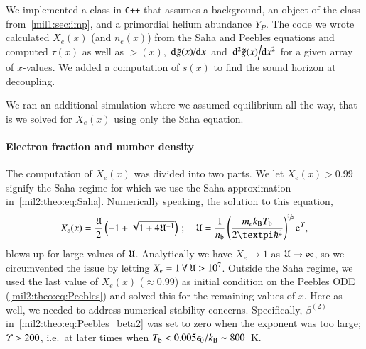 

We implemented a class in \verb|C++| that assumes a background, an object of the class from~\cref{mil1:sec:imp}, and a primordial helium abundance $Y_P$. The code we wrote calculated $X_e(x)$ (and $n_e(x)$) from the Saha and Peebles equations and computed $\tau(x)$ as well as $\gt(x)$, $\dv*[]{\tilde{g}(x)}{x}$ and $\dv*[2]{\tilde{g}(x)}{x}$ for a given array of $x$-values. We added a computation of $s(x)$ to find the sound horizon at decoupling.

We ran an additional simulation where we assumed equilibrium all the way, that is we solved for $X_e(x)$ using only the Saha equation. 

\paragraph{Electron fraction and number density}
    The computation of $X_e(x)$ was divided into two parts. We let $X_e(x)>0.99$ signify the Saha regime for which we use the Saha approximation in~\cref{mil2:theo:eq:Saha}. Numerically speaking, the solution to this equation, 
    \begin{equation}\label{mil2:imp:eq:sol_Saha}
        X_e(x) = \frac{\expr}{2}\left( -1+\sqrt{1+4\expr^{-1}}\right)\,; \quad 
            \expr = \frac{1}{n\ped{b}} \left( \frac{m_e k\ped{B} T\ped{b} }{2\pi \hbar^2} \right)^{\sfrac{3}{2}} \eu^{\epskT},
    \end{equation}
    blows up for large values of $\mathfrak{U}$. Analytically we have $X_e\to 1$ as $\mathfrak{U}\to \infty$, so we circumvented the issue by letting $X_e=1 \,\forall\, \mathfrak{U} > 10^7$. Outside the Saha regime, we used the last value of $X_e(x)$ ($\approx 0.99$) as initial condition on the Peebles ODE (\cref{mil2:theo:eq:Peebles}) and solved this for the remaining values of $x$. Here as well, we needed to address numerical stability concerns. Specifically, $\beta^{(2)}$ in~\cref{mil2:theo:eq:Peebles_beta2} was set to zero when the exponent was too large; $\varUpsilon> 200$, i.e.\ at later times when $T_\mathrm{b} < 0.005 \epsilon_0/k_\mathrm{B} \sim 800$~K. 
    
